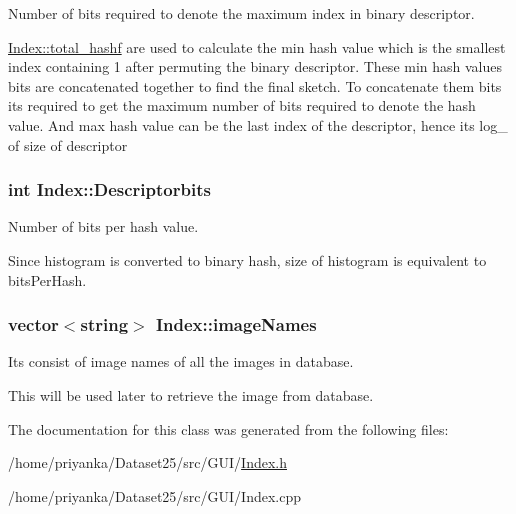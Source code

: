 \-Number of bits required to denote the maximum index in binary descriptor. 

\hyperlink{classIndex_a7e25594ed3a2d5af48a3370c36ac6481}{\-Index\-::total\-\_\-hashf} are used to calculate the min hash value which is the smallest index containing 1 after permuting the binary descriptor. \-These min hash values bits are concatenated together to find the final sketch. \-To concatenate them bits its required to get the maximum number of bits required to denote the hash value. \-And max hash value can be the last index of the descriptor, hence its log\-\_ of size of descriptor \hypertarget{classIndex_ac11c8f73f786ae87d455b214d6978fd1}{
\subsubsection[{\-Descriptorbits}]{\setlength{\rightskip}{0pt plus 5cm}int {\bf \-Index\-::\-Descriptorbits}}}\label{classIndex_ac11c8f73f786ae87d455b214d6978fd1}


\-Number of bits per hash value. 

\-Since histogram is converted to binary hash, size of histogram is equivalent to bits\-Per\-Hash. \hypertarget{classIndex_a10d91af933c37e605b1d9bd1a3995f8c}{
\subsubsection[{image\-Names}]{\setlength{\rightskip}{0pt plus 5cm}vector$<$string$>$ {\bf \-Index\-::image\-Names}}}\label{classIndex_a10d91af933c37e605b1d9bd1a3995f8c}


\-Its consist of image names of all the images in database. 

\-This will be used later to retrieve the image from database. 

\-The documentation for this class was generated from the following files\-:\begin{DoxyCompactItemize}
\item 
/home/priyanka/\-Dataset25/src/\-G\-U\-I/\hyperlink{Index_8h}{\-Index.\-h}\item 
/home/priyanka/\-Dataset25/src/\-G\-U\-I/\-Index.\-cpp\end{DoxyCompactItemize}
